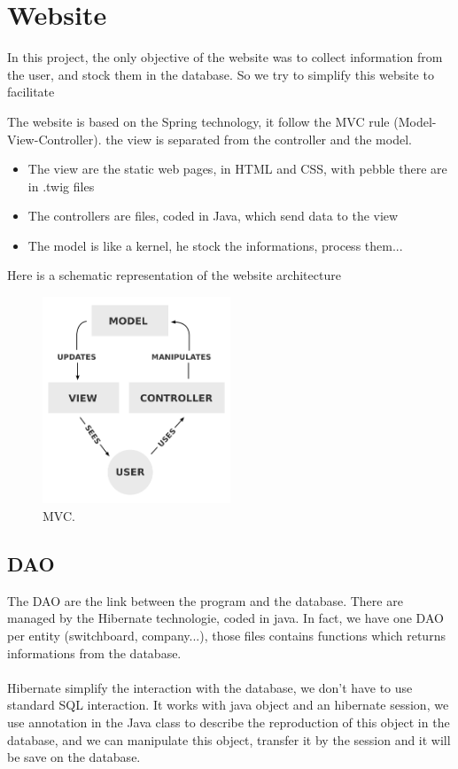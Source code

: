 \chapter{Website}

In this project, the only objective of the website was to collect information from the user, and stock them in the database.
So we try to simplify this website to facilitate 


The website is based on the Spring technology,  it follow the MVC rule (Model-View-Controller). the view is separated from the controller and the model.

\begin{itemize}  
\item The view are the static web pages, in HTML and CSS, with pebble there are in .twig files
\item The controllers are files, coded in Java, which send data to the view
\item The model is like a kernel, he stock the informations, process them...

\end{itemize}  

Here is a schematic representation of the website architecture

\begin{figure}[!ht]
  \caption{MVC.}
  \centering
    \includegraphics[width=0.5\textwidth]{img/mvc.png}
\end{figure}




\section{DAO}

The DAO are the link between the program and the database. There are managed by the Hibernate technologie, coded in java.
In fact, we have one DAO per entity (switchboard, company...), those files contains functions which returns informations from the database.
\\
\\
Hibernate simplify the interaction with the database, we don't have to use standard SQL interaction.
It works with java object and an hibernate session, we use annotation in the Java class to describe the reproduction of this object in the database,
and we can manipulate this object, transfer it by the session and it will be save on the database.



